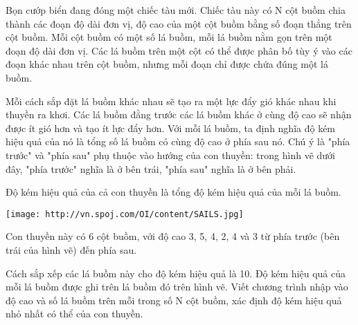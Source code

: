 Bọn cướp biển đang đóng một chiếc tàu mới. Chiếc tàu này có N cột buồm chia thành các đoạn độ dài đơn vị, độ cao của một cột buồm bằng số đoạn thẳng trên cột buồm. Mỗi cột buồm có một số lá buồm, mỗi lá buồm nằm gọn trên một đoạn độ dài đơn vị. Các lá buồm trên một cột có thể được phân bố tùy ý vào các đoạn khác nhau trên cột buồm, nhưng mỗi đoạn chỉ được chứa đúng một lá buồm.  

   Mỗi cách sắp đặt lá buồm khác nhau sẽ tạo ra một lực đẩy gió khác nhau khi thuyền ra khơi. Các lá buồm đằng trước các lá buồm khác ở cùng độ cao sẽ nhận được ít gió hơn và tạo ít lực đẩy hơn. Với mỗi lá buồm, ta định nghĩa độ kém hiệu quả của nó là tổng số lá buồm có cùng độ cao ở phía sau nó. Chú ý là "phía trước" và "phía sau" phụ thuộc vào hướng của con thuyền: trong hình vẽ dưới đây, "phía trước" nghĩa là ở bên trái, "phía sau" nghĩa là ở bên phải.  

   Độ kém hiệu quả của cả con thuyền là tổng độ kém hiệu quả của mỗi lá buồm.  


\texttt{[image: http://vn.spoj.com/OI/content/SAILS.jpg]}

   Con thuyền này có 6 cột buồm, với độ cao 3, 5, 4, 2, 4 và 3 từ phía trước (bên trái của hình vẽ) đến phía sau.  

   Cách sắp xếp các lá buồm này cho độ kém hiệu quả là 10. Độ kém hiệu quả của mỗi lá buồm được ghi trên lá buồm đó trên hình vẽ.
Viết chương trình nhập vào độ cao và số lá buồm trên mỗi trong số N cột buồm, xác định độ kém hiệu quả nhỏ nhất có thể của con thuyền.